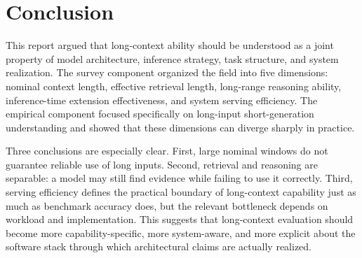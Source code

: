 \documentclass{article}
\begin{document}
\section{Conclusion}
\label{sec:conclusion}

This report argued that long-context ability should be understood as a joint property of model architecture, inference strategy, task structure, and system realization. The survey component organized the field into five dimensions: nominal context length, effective retrieval length, long-range reasoning ability, inference-time extension effectiveness, and system serving efficiency. The empirical component focused specifically on long-input short-generation understanding and showed that these dimensions can diverge sharply in practice.

Three conclusions are especially clear. First, large nominal windows do not guarantee reliable use of long inputs. Second, retrieval and reasoning are separable: a model may still find evidence while failing to use it correctly. Third, serving efficiency defines the practical boundary of long-context capability just as much as benchmark accuracy does, but the relevant bottleneck depends on workload and implementation. This suggests that long-context evaluation should become more capability-specific, more system-aware, and more explicit about the software stack through which architectural claims are actually realized.



\end{document}
